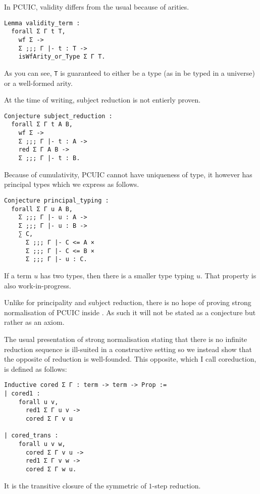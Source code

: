 
In \acrshort{PCUIC}, validity differs from the usual because of arities.
\begin{verbatim}
Lemma validity_term :
  forall Σ Γ t T,
    wf Σ ->
    Σ ;;; Γ |- t : T ->
    isWfArity_or_Type Σ Γ T.
\end{verbatim}
As you can see, \texttt{T} is guaranteed to either be a type (as in
be typed in a universe) or a well-formed arity.


At the time of writing, subject reduction is not entierly proven.
\begin{verbatim}
Conjecture subject_reduction :
  forall Σ Γ t A B,
    wf Σ ->
    Σ ;;; Γ |- t : A ->
    red Σ Γ A B ->
    Σ ;;; Γ |- t : B.
\end{verbatim}


Because of cumulativity, \acrshort{PCUIC} cannot have uniqueness of type, it
however has principal types which we express as follows.
\begin{verbatim}
Conjecture principal_typing :
  forall Σ Γ u A B,
    Σ ;;; Γ |- u : A ->
    Σ ;;; Γ |- u : B ->
    ∑ C,
      Σ ;;; Γ |- C <= A ×
      Σ ;;; Γ |- C <= B ×
      Σ ;;; Γ |- u : C.
\end{verbatim}
If a term \(u\) has two types, then there is a smaller type typing \(u\).
That property is also work-in-progress.


Unlike for principality and subject reduction, there is no hope of proving
strong normalisation of \acrshort{PCUIC} inside \Coq. As such it will not be
stated as a conjecture but rather as an axiom.

The usual presentation of strong normalisation stating that there is no infinite
reduction sequence is ill-suited in a constructive setting so we instead show
that the opposite of reduction is well-founded.
This opposite, which I call coreduction, is defined as follows:
\begin{verbatim}
Inductive cored Σ Γ : term -> term -> Prop :=
| cored1 :
    forall u v,
      red1 Σ Γ u v ->
      cored Σ Γ v u

| cored_trans :
    forall u v w,
      cored Σ Γ v u ->
      red1 Σ Γ v w ->
      cored Σ Γ w u.
\end{verbatim}
It is the transitive closure of the symmetric of \(1\)-step reduction.

